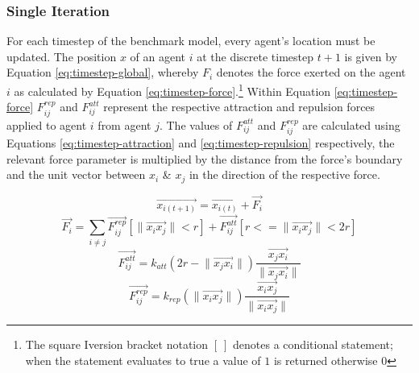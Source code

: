     \subsubsection{Single Iteration}
      For each timestep of the benchmark model, every agent's location must be updated. The position $x$ of an agent $i$ at the discrete timestep $t+1$ is given by Equation \ref{eq:timestep-global}, whereby $F_{i}$ denotes the force exerted on the agent $i$ as calculated by Equation \ref{eq:timestep-force}.\footnote{The square Iversion bracket notation $[\:]$ denotes a conditional statement; when the statement evaluates to true a value of $1$ is returned otherwise $0$} Within Equation \ref{eq:timestep-force} $F_{ij}^{rep}$ and $F_{ij}^{att}$ represent the respective attraction and repulsion forces applied to agent $i$ from agent $j$. The values of $F_{ij}^{att}$ and $F_{ij}^{rep}$ are calculated using Equations \ref{eq:timestep-attraction} and \ref{eq:timestep-repulsion} respectively, the relevant force parameter is multiplied by the distance from the force's boundary and the unit vector between $x_{i}$ \& $x_{j}$ in the direction of the respective force.
      
      \vspace{-0.3cm}
      \begin{equation}\label{eq:timestep-global}
        \overrightarrow{x_{i(t+1)}} = \overrightarrow{x_{i(t)}} + \overrightarrow{F_{i}}
      \end{equation}
      \vspace{-0.3cm}
      \begin{equation}\label{eq:timestep-force}
        \overrightarrow{F_{i}} = \sum\limits_{i \neq j} \overrightarrow{F_{ij}^{rep}}[\lVert\overrightarrow{x_{i}x_{j}}\rVert < r] + \overrightarrow{F_{ij}^{att}}[r <= \lVert\overrightarrow{x_{i}x_{j}}\rVert < 2r]
      \end{equation}
      \vspace{-0.3cm}
      \begin{equation}\label{eq:timestep-attraction}
        \overrightarrow{F_{ij}^{att}} = k_{att}(2r-\lVert\overrightarrow{x_{j}x_{i}}\rVert)\frac{\overrightarrow{x_{j}x_{i}}}{\lVert\overrightarrow{x_{j}x_{i}}\rVert}
      \end{equation} 
      \begin{equation}\label{eq:timestep-repulsion}
        \overrightarrow{F_{ij}^{rep}} = k_{rep}(\lVert\overrightarrow{x_{i}x_{j}}\rVert)\frac{\overrightarrow{x_{i}x_{j}}}{\lVert\overrightarrow{x_{i}x_{j}}\rVert}
      \end{equation}
      
